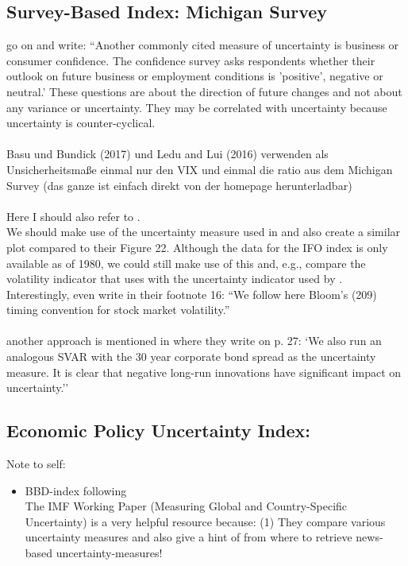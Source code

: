 \documentclass[a4paper,12pt,oneside,pointednumbers,bibtotoc,bigheadings,liststotoc]{scrbook}
\begin{document}
\subsection{Survey-Based Index: Michigan Survey}
\label{sec:michigansurvey}
\citet{orlikandveldkamp:14} go on and write: ``Another commonly cited measure of uncertainty is business or consumer confidence. The confidence survey asks respondents whether their outlook on future business or employment conditions is 'positive', negative or neutral.' These questions are about the direction of future changes and not about any variance or uncertainty. They may be correlated with uncertainty because uncertainty is counter-cyclical.\\
\\
Basu und Bundick (2017) und Ledu and Lui (2016) verwenden als Unsicherheitsmaße einmal nur den VIX und einmal die ratio aus dem Michigan Survey (das ganze ist einfach direkt von der homepage herunterladbar)\\
\\
Here I should also refer to \citet{bachmannetal:13}.
\\
We should make use of the uncertainty measure used in \citet{bachmannetal:13} and also create a similar plot compared to their Figure 22. Although the data for the IFO index is only available as of 1980, we could still make use of this and, e.g., compare the volatility indicator that \citet{bloom:09} uses with the uncertainty indicator used by \citet{bachmannetal:13}. Interestingly, \citet{bachmannetal:13} even write in their footnote 16: ``We follow here Bloom's (209) timing convention for stock market volatility.''\\
\\
another approach is mentioned in \citet{bachmannetal:13} where they write on p. 27: `We also run an analogous SVAR with the 30 year corporate bond spread as the uncertainty measure. It is clear that negative long-run innovations have significant impact on uncertainty.''



\subsection{Economic Policy Uncertainty Index: \citet{bakeretal:15}}
\label{sec:epuindex}

\begingroup
    \fontsize{8pt}{12pt}\selectfont
    Note to self:
\begin{itemize}
	\item  BBD-index following \citet{bakeretal:15}\\
The IMF Working Paper (Measuring Global and Country-Specific Uncertainty) is a very helpful resource because: (1) They compare various uncertainty measures and also give a hint of from where to retrieve news-based uncertainty-measures!
\end{itemize}
\endgroup
\end{document}
